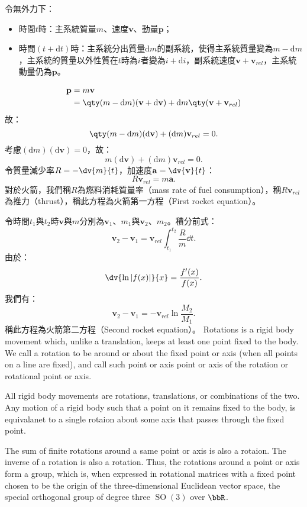 \documentclass[a4paper,12pt]{article}
\begin{document}
令無外力下：
\begin{itemize}
\item 時間$t$時：主系統質量$m$、速度$\mathbf{v}$、動量$\mathbf{p}$；
\item 時間$(t+\mathrm{d}t)$時：主系統分出質量$\mathrm{d}m$的副系統，使得主系統質量變為$m-\mathrm{d}m$，主系統的質量以外性質在$t$時為$i$者變為$i+\mathrm{d}i$，副系統速度$\mathbf{v}+\mathbf{v}_{rel}$，主系統動量仍為$\mathbf{p}$。
\end{itemize}
\[\begin{aligned}
\mathbf{p}&=m\mathbf{v} \\
&=\qty(m-\mathrm{d}m)(\mathbf{v}+\mathrm{d}\mathbf{v})+\mathrm{d}m\qty(\mathbf{v}+\mathbf{v}_{rel})
\end{aligned}\]
故：
\[\qty(m-\mathrm{d}m)(\mathrm{d}\mathbf{v})+(\mathrm{d}m)\mathbf{v}_{rel}=0.\]
考慮$(\mathrm{d}m)(\mathrm{d}\mathbf{v})=0$，故：
\[m(\mathrm{d}\mathbf{v})+(\mathrm{d}m)\mathbf{v}_{rel}=0.\]
令質量減少率$R=-\dv{m}{t}$，加速度$\mathbf{a}=\dv{\mathbf{v}}{t}$：
\[R\mathbf{v}_{rel}=m\mathbf{a}.\]
對於火箭，我們稱$R$為燃料消耗質量率（mass rate of fuel consumption），稱$R\mathbf{v}_{rel}$為推力（thrust），稱此方程為火箭第一方程（First rocket equation）。

令時間$t_1$與$t_2$時$\mathbf{v}$與$m$分別為$\mathbf{v}_1$、$m_1$與$\mathbf{v}_2$、$m_2$。積分前式：
\[\mathbf{v}_2-\mathbf{v}_1=\mathbf{v}_{rel}\int_{t_1}^{t_2}\frac{R}{m}\dd{t}.\]
由於：
\[\dv{\ln|f(x)|}{x}=\frac{f'(x)}{f(x)}.\]
我們有：
\[\mathbf{v}_2-\mathbf{v}_1=-\mathbf{v}_{rel}\ln\frac{M_2}{M_1}.\]
稱此方程為火箭第二方程（Second rocket equation）。
Rotations is a rigid body movement which, unlike a translation, keeps at least one point fixed to the body. We call a rotation to be around or about the fixed point or axis (when all points on a line are fixed), and call such point or axis point or axis of the rotation or rotational point or axis.

All rigid body movements are rotations, translations, or combinations of the two.
Any motion of a rigid body such that a point on it remains fixed to the body, is equivalanet to a single rotaion about some axis that passes through the fixed point.

The sum of finite rotations around a same point or axis is also a rotaion. The inverse of a rotation is also a rotation. Thus, the rotations around a point or axis form a group, which is, when expressed in rotational matrices with a fixed point chosen to be the origin of the three-dimensional Euclidean vector space, the special orthogonal group of degree three $\operatorname{SO}(3)$ over $\bbR$.
\end{document}
